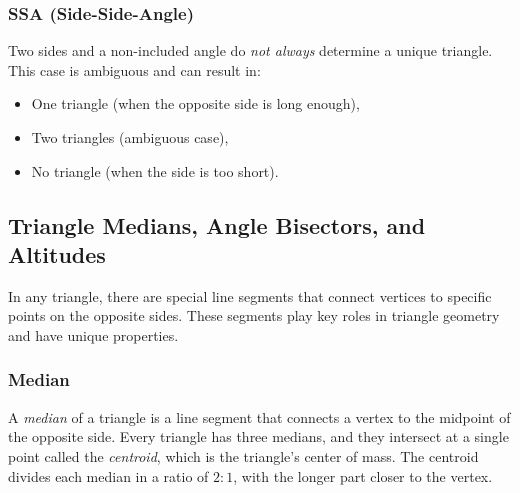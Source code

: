 \subsubsection{SSA (Side-Side-Angle)}
Two sides and a non-included angle do \emph{not always} determine a unique triangle. This case is ambiguous and can result in:
\begin{itemize}
    \item One triangle (when the opposite side is long enough),
    \item Two triangles (ambiguous case),
    \item No triangle (when the side is too short).
\end{itemize}
\begin{center}
\end{center}

\subsection{Triangle Medians, Angle Bisectors, and Altitudes}

In any triangle, there are special line segments that connect vertices to specific points on the opposite sides. These segments play key roles in triangle geometry and have unique properties.

\subsubsection*{Median}

A \emph{median} of a triangle is a line segment that connects a vertex to the midpoint of the opposite side. Every triangle has three medians, and they intersect at a single point called the \emph{centroid}, which is the triangle’s center of mass. The centroid divides each median in a ratio of \( 2:1 \), with the longer part closer to the vertex.

